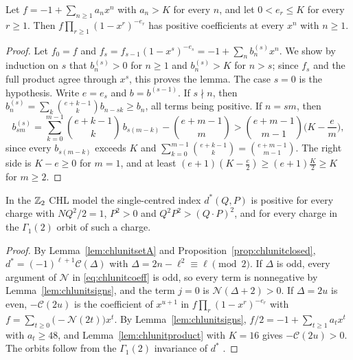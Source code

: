 \begin{lemma}\label{lem:chlunitproduct}
Let $f=-1+\sum_{n\ge1}a_nx^n$ with $a_n>K$ for every $n$, and let $0<e_r\le K$ for every $r\ge1$. Then $f\prod_{r\ge1}(1-x^r)^{-e_r}$ has positive coefficients at every $x^n$ with $n\ge1$.
\end{lemma}

\begin{proof}
Let $f_0=f$ and $f_s=f_{s-1}(1-x^s)^{-e_s}=-1+\sum_nb^{(s)}_nx^n$. We show by induction on $s$ that $b^{(s)}_n>0$ for $n\ge1$ and $b^{(s)}_n>K$ for $n>s$; since $f_s$ and the full product agree through $x^s$, this proves the lemma. The case $s=0$ is the hypothesis. Write $e=e_s$ and $b=b^{(s-1)}$. If $s\nmid n$, then $b^{(s)}_n=\sum_k\binom{e+k-1}kb_{n-sk}\ge b_n$, all terms being positive. If $n=sm$, then
\[
b^{(s)}_{sm}=\sum_{k=0}^{m-1}\binom{e+k-1}k\,b_{s(m-k)}-\binom{e+m-1}m>\binom{e+m-1}{m-1}\Big(K-\frac em\Big),
\]
since every $b_{s(m-k)}$ exceeds $K$ and $\sum_{k=0}^{m-1}\binom{e+k-1}k=\binom{e+m-1}{m-1}$. The right side is $K-e\ge0$ for $m=1$, and at least $(e+1)(K-\tfrac e2)\ge(e+1)\tfrac K2\ge K$ for $m\ge2$.
\end{proof}

\begin{theorem}\label{thm:chlunit}
In the $\mathbb{Z}_2$ CHL model the single-centred index $d^*(Q,P)$ is positive for every charge with $NQ^2/2=1$, $P^2>0$ and $Q^2P^2>(Q\cdot P)^2$, and for every charge in the $\Gamma_1(2)$ orbit of such a charge.
\end{theorem}

\begin{proof}
By Lemma~\ref{lem:chlunitsetA} and Proposition~\ref{prop:chlunitclosed}, $d^*=(-1)^{\ell+1}\mathcal C(\Delta)$ with $\Delta=2n-\ell^2\equiv\ell\pmod2$. If $\Delta$ is odd, every argument of $\mathcal N$ in \eqref{eq:chlunitcoeff} is odd, so every term is nonnegative by Lemma~\ref{lem:chlunitsigns}, and the term $j=0$ is $\mathcal N(\Delta+2)>0$. If $\Delta=2u$ is even, $-\mathcal C(2u)$ is the coefficient of $x^{u+1}$ in $f\prod_r(1-x^r)^{-e_r}$ with $f=\sum_{t\ge0}\big(-\mathcal N(2t)\big)x^t$. By Lemma~\ref{lem:chlunitsigns}, $f/2=-1+\sum_{t\ge1}a_tx^t$ with $a_t\ge48$, and Lemma~\ref{lem:chlunitproduct} with $K=16$ gives $-\mathcal C(2u)>0$. The orbits follow from the $\Gamma_1(2)$ invariance of $d^*$ \cite[(5.17)--(5.18)]{BSS25}.
\end{proof}

